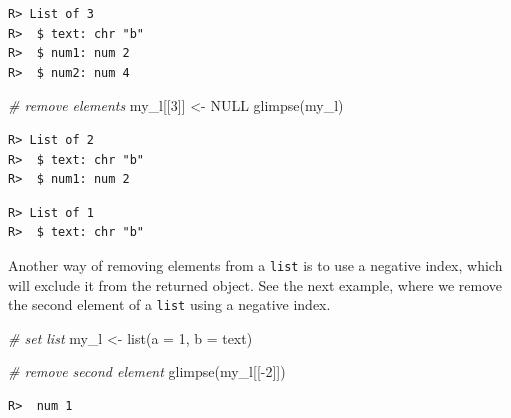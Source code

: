 \documentclass[
  12pt,
]{book}
\newenvironment{Shaded}{\begin{snugshade}}{\end{snugshade}}
\newcommand{\AttributeTok}[1]{\textcolor[rgb]{0.61,0.61,0.61}{#1}}
\newcommand{\CommentTok}[1]{\textcolor[rgb]{0.37,0.37,0.37}{\textit{#1}}}
\newcommand{\ConstantTok}[1]{\textcolor[rgb]{0,0,0}{#1}}
\newcommand{\DecValTok}[1]{\textcolor[rgb]{0.06,0.06,0.06}{#1}}
\newcommand{\FunctionTok}[1]{\textcolor[rgb]{0,0,0}{#1}}
\newcommand{\NormalTok}[1]{#1}
\newcommand{\OtherTok}[1]{\textcolor[rgb]{0.37,0.37,0.37}{#1}}
\newcommand{\SpecialCharTok}[1]{\textcolor[rgb]{0,0,0}{#1}}
\newcommand{\StringTok}[1]{\textcolor[rgb]{0.5,0.5,0.5}{#1}}
\begin{document}
\begin{verbatim}
R> List of 3
R>  $ text: chr "b"
R>  $ num1: num 2
R>  $ num2: num 4
\end{verbatim}

\begin{Shaded}
\begin{Highlighting}[]
\CommentTok{\# remove elements}
\NormalTok{my\_l[[}\DecValTok{3}\NormalTok{]] }\OtherTok{\textless{}{-}} \ConstantTok{NULL}
\FunctionTok{glimpse}\NormalTok{(my\_l)}
\end{Highlighting}
\end{Shaded}

\begin{verbatim}
R> List of 2
R>  $ text: chr "b"
R>  $ num1: num 2
\end{verbatim}

\begin{Shaded}
\end{Shaded}

\begin{verbatim}
R> List of 1
R>  $ text: chr "b"
\end{verbatim}

Another way of removing elements from a \texttt{list} is to use a negative index, which will exclude it from the returned object. See the next example, where we remove the second element of a \texttt{list} using a negative index.

\begin{Shaded}
\begin{Highlighting}[]
\CommentTok{\# set list}
\NormalTok{my\_l }\OtherTok{\textless{}{-}} \FunctionTok{list}\NormalTok{(}\AttributeTok{a =} \DecValTok{1}\NormalTok{, }
             \AttributeTok{b =} \StringTok{\textquotesingle{}text\textquotesingle{}}\NormalTok{)}

\CommentTok{\# remove second element}
\FunctionTok{glimpse}\NormalTok{(my\_l[[}\SpecialCharTok{{-}}\DecValTok{2}\NormalTok{]])}
\end{Highlighting}
\end{Shaded}

\begin{verbatim}
R>  num 1
\end{verbatim}
\end{document}
